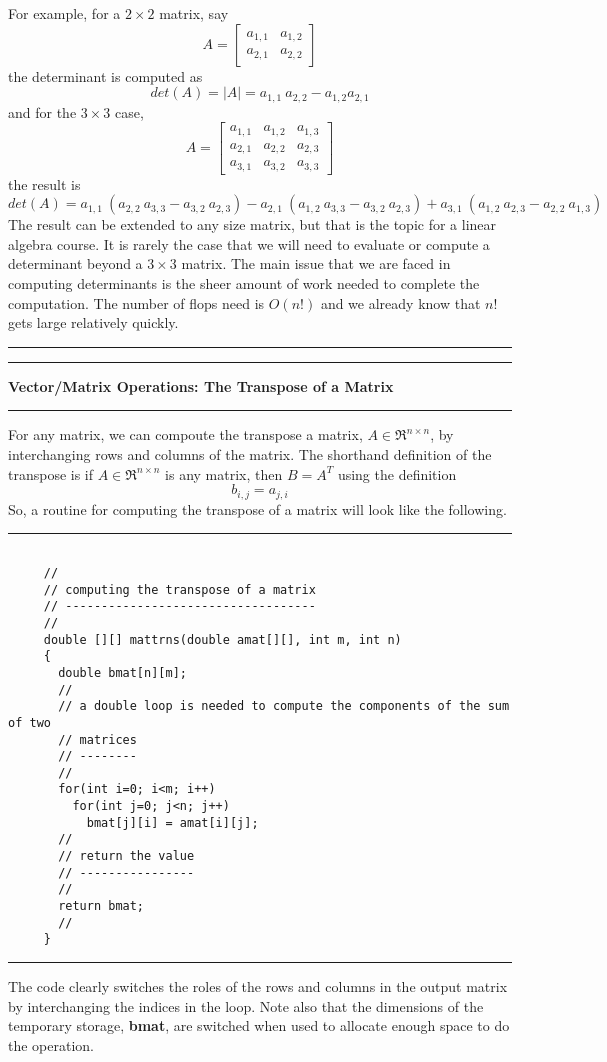 \documentclass[10pt,fleqn]{article}
\begin{document}
For example, for a $2\times 2$ matrix, say
$$
  A = \left[
        \begin{array}{cc}
          a_{1,1} & a_{1,2}  \\
          a_{2,1} & a_{2,2} 
        \end{array}
      \right]
$$
the determinant is computed as
$$
  det(A) = \left| A \right| = a_{1,1}\ a_{2,2} - a_{1, 2} a_{2,1}
$$
and for the $3\times 3$ case, 
$$
  A = \left[
        \begin{array}{ccc}
          a_{1,1} & a_{1,2} & a_{1,3} \\
          a_{2,1} & a_{2,2} & a_{2,3} \\
          a_{3,1} & a_{3,2} & a_{3,3}
        \end{array}
      \right]
$$
the result is
$$
  det(A) = a_{1,1}\ \left( a_{2,2}\ a_{3, 3} - a_{3,2}\ a_{2,3} \right)
         - a_{2,1}\ \left( a_{1,2}\ a_{3, 3} - a_{3,2}\ a_{2,3} \right)
         + a_{3,1}\ \left( a_{1,2}\ a_{2, 3} - a_{2,2}\ a_{1,3} \right)
$$
The result can be extended to any size matrix, but that is the topic for a
linear algebra course. It is rarely the case that we will need to evaluate or
compute a determinant beyond a $3\times 3$ matrix. The main issue that we are
faced in computing determinants is the sheer amount of work needed to complete
the computation. The number of flops need is $O(n!)$ and we already know that
$n!$ gets large relatively quickly.
\vskip0.1in\hrule\vskip0.1in
\newpage
\vskip0.1in\hrule\vskip0.1in
\noindent
{\bf Vector/Matrix Operations: The Transpose of a Matrix}
\vskip0.1in\hrule\vskip0.1in
\noindent
For any matrix, we can compoute the transpose a matrix, $A\in\Re^{n\times n}$,
by interchanging rows and columns of the matrix. The shorthand definition of the
transpose is if $A\in\Re^{n\times n}$ is any matrix, then $B=A^T$ using the
definition
$$
  b_{i,j} = a_{j,i} 
$$
So, a routine for computing the transpose of a matrix will look like the
following.
\vskip0.1in\hrule\vskip0.1in
\begin{verbatim}

     //
     // computing the transpose of a matrix
     // -----------------------------------
     //
     double [][] mattrns(double amat[][], int m, int n)
     {
       double bmat[n][m];
       //
       // a double loop is needed to compute the components of the sum of two
       // matrices
       // --------
       //
       for(int i=0; i<m; i++) 
         for(int j=0; j<n; j++)
           bmat[j][i] = amat[i][j];
       //
       // return the value
       // ----------------
       //
       return bmat;
       //
     }

\end{verbatim}
\vskip0.1in\hrule\vskip0.1in
The code clearly switches the roles of the rows and columns in the output matrix
by interchanging the indices in the loop. Note also that the dimensions of the
temporary storage, {\bf bmat}, are switched when used to allocate enough space
to do the operation.
\end{document}
